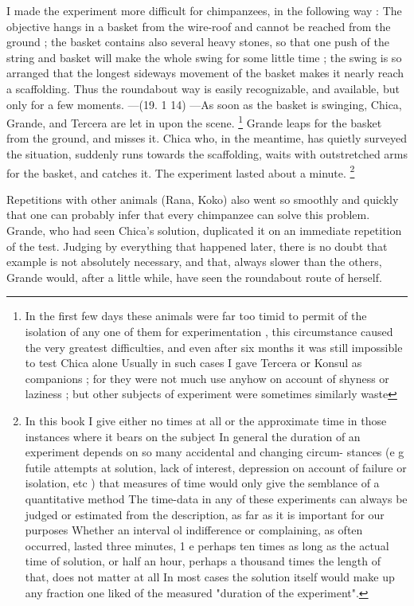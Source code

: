 \documentclass{article}
\begin{document}
I made the experiment more difficult for chimpanzees,
in the following way : The objective hangs in a basket from
the wire-roof and cannot be reached from the ground ; the
basket contains also several heavy stones, so that one push
of the string and basket will make the whole swing for some
little time ; the swing is so arranged that the longest sideways
movement of the basket makes it nearly reach a scaffolding.
Thus the roundabout way is easily recognizable, and available,
but only for a few moments. —(19. 1 14) —As soon as the
basket is swinging, Chica, Grande, and Tercera are let in
upon the scene. \footnote{ In the first few days these animals were far too timid to permit of the
isolation of any one of them for experimentation , this circumstance
caused the very greatest difficulties, and even after six months it was
still impossible to test Chica alone Usually in such cases I gave
Tercera or Konsul as companions ; for they were not much use anyhow
on account of shyness or laziness ; but other subjects of experiment
were sometimes similarly waste} Grande leaps for the basket from the
ground, and misses it. Chica who, in the meantime, has
quietly surveyed the situation, suddenly runs towards the
scaffolding, waits with outstretched arms for the basket, and
catches it. The experiment lasted about a minute. \footnote{ In this book I give either no times at all or the approximate time
in those instances where it bears on the subject In general the duration
of an experiment depends on so many accidental and changing circum-
stances (e g futile attempts at solution, lack of interest, depression on
account of failure or isolation, etc ) that measures of time would only
give the semblance of a quantitative method The time-data in any
of these experiments can always be judged or estimated from the
description, as far as it is important for our purposes Whether an
interval ol indifference or complaining, as often occurred, lasted three
minutes, 1 e perhaps ten times as long as the actual time of solution,
or half an hour, perhaps a thousand times the length of that, does not
matter at all In most cases the solution itself would make up any
fraction one liked of the measured "duration of the experiment".}

Repetitions with other animals (Rana, Koko) also went
so smoothly and quickly that one can probably infer that
every chimpanzee can solve this problem. Grande, who had
seen Chica’s solution, duplicated it on an immediate repetition
of the test. Judging by everything that happened later,
there is no doubt that example is not absolutely necessary,
and that, always slower than the others, Grande would,
after a little while, have seen the roundabout route of herself.
\end{document}
